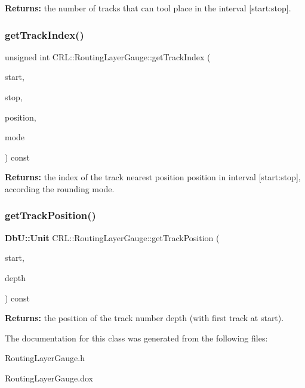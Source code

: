 {\bfseries Returns\+:} the number of tracks that can tool place in the interval {\ttfamily \mbox{[}start\+:stop\mbox{]}}. \mbox{\label{classCRL_1_1RoutingLayerGauge_ad61cdf130c8b739bb44a01cfd5968022}} 
\subsubsection{\texorpdfstring{get\+Track\+Index()}{getTrackIndex()}}
{\footnotesize\ttfamily unsigned int C\+R\+L\+::\+Routing\+Layer\+Gauge\+::get\+Track\+Index (\begin{DoxyParamCaption}\item[{\textbf{ Db\+U\+::\+Unit}}]{start,  }\item[{\textbf{ Db\+U\+::\+Unit}}]{stop,  }\item[{\textbf{ Db\+U\+::\+Unit}}]{position,  }\item[{unsigned}]{mode }\end{DoxyParamCaption}) const}

{\bfseries Returns\+:} the index of the track nearest position {\ttfamily position} in interval {\ttfamily \mbox{[}start\+:stop\mbox{]}}, according the rounding {\ttfamily mode}. \mbox{\label{classCRL_1_1RoutingLayerGauge_a470828019c5cde566e7aa6d27ef68439}} 
\subsubsection{\texorpdfstring{get\+Track\+Position()}{getTrackPosition()}}
{\footnotesize\ttfamily \textbf{ Db\+U\+::\+Unit} C\+R\+L\+::\+Routing\+Layer\+Gauge\+::get\+Track\+Position (\begin{DoxyParamCaption}\item[{\textbf{ Db\+U\+::\+Unit}}]{start,  }\item[{unsigned}]{depth }\end{DoxyParamCaption}) const}

{\bfseries Returns\+:} the position of the track number {\ttfamily depth} (with first track at {\ttfamily start}). 

The documentation for this class was generated from the following files\+:\begin{DoxyCompactItemize}
\item 
Routing\+Layer\+Gauge.\+h\item 
Routing\+Layer\+Gauge.\+dox\end{DoxyCompactItemize}
